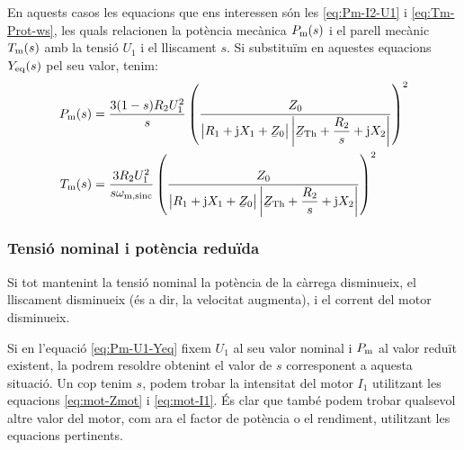 En aquests casos les equacions que ens interessen són les \eqref{eq:Pm-I2-U1} i \eqref{eq:Tm-Prot-ws}, les quals relacionen la potència mecànica $P_\mathrm{m}(s)$ i el parell mecànic $T_\mathrm{m}(s)$ amb la tensió $U_1$ i el lliscament $s$. Si substituïm en aquestes equacions $Y_\mathrm{eq}(s)$ pel seu valor, tenim:
\begin{subequations}
	\begin{align}
	P\ped{m}(s) &= \frac{3(1-s) R_2 U_1^2}{s} \left( \frac{Z_0}{\big|R_1 + \ju X_1 + \cmplx{Z}_0\big| \left|\cmplx{Z}\ped{Th} + \dfrac{R_2}{s} + \ju X_2\right|} \right)^2 \label{eq:Pm-U1-Yeq} \\
	T\ped{m}(s) &= \frac{3 R_2 U_1^2}{s\omega\ped{m,sinc}}  \left( \frac{Z_0}{\big|R_1 + \ju X_1 + \cmplx{Z}_0\big| \left|\cmplx{Z}\ped{Th} + \dfrac{R_2}{s} + \ju X_2\right|} \right)^2\label{eq:Tm-U1-Yeq}
	\end{align}
\end{subequations}

	
\subsubsection{Tensió nominal i potència reduïda}	

Si tot mantenint la tensió nominal la potència de la càrrega disminueix, el lliscament disminueix (és a dir, la velocitat augmenta), i el corrent del motor disminueix.
	
Si en l'equació \eqref{eq:Pm-U1-Yeq} fixem $U_1$ al seu valor nominal i  $P_\mathrm{m}$ al  valor reduït existent,  la podrem resoldre obtenint el valor de $s$ corresponent  a aquesta situació. Un cop tenim $s$, podem trobar la intensitat del motor $I_1$ utilitzant les equacions \eqref{eq:mot-Zmot} i \eqref{eq:mot-I1}. És clar que també podem trobar qualsevol altre valor del motor, com  ara el factor de potència o el rendiment, utilitzant les equacions pertinents.


